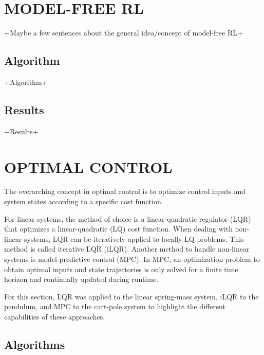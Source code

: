 \documentclass[letterpaper, 10 pt, conference]{ieeeconf}  %
\begin{document}
%

\section{MODEL-FREE RL}
+Maybe a few sentences about the general idea/concept of model-free RL+
\subsection{Algorithm}

+Algorithm+

\subsection{Results}

+Results+

\section{OPTIMAL CONTROL}
The overarching concept in optimal control is to optimize control inputs and system states according to a specific cost function. 

For linear systems, the method of choice is a linear-quadratic regulator (LQR) that optimizes a linear-quadratic (LQ) cost function. When dealing with non-linear systems, LQR can be iteratively applied to locally LQ problems. This method is called iterative LQR (iLQR). Another method to handle non-linear systems is model-predictive control (MPC). In MPC, an optimization problem to obtain optimal inputs and state trajectories is only solved for a finite time horizon and continually updated during runtime.

For this section, LQR was applied to the linear spring-mass system, iLQR to the pendulum, and MPC to the cart-pole system to highlight the different capabilities of these approaches.
\subsection{Algorithms}
\end{document}
